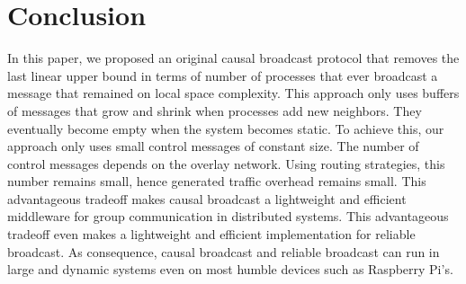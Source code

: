
\section{Conclusion}
\label{sec:conclusion}


In this paper, we proposed an original causal broadcast protocol that removes
the last linear upper bound in terms of number of processes that ever broadcast
a message that remained on local space complexity. This approach only uses
buffers of messages that grow and shrink when processes add new neighbors. They
eventually become empty when the system becomes static. To achieve this, our
approach only uses small control messages of constant size. The number of
control messages depends on the overlay network. Using routing strategies, this
number remains small, hence generated traffic overhead remains small. This
advantageous tradeoff makes causal broadcast a lightweight and efficient
middleware for group communication in distributed systems. This advantageous
tradeoff even makes \RPCBROADCAST a lightweight and efficient implementation
for reliable broadcast. As consequence, causal broadcast and reliable broadcast
can run in large and dynamic systems even on most humble devices such as
Raspberry Pi’s.




